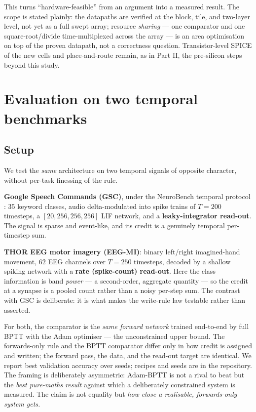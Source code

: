 \documentclass[11pt]{article}
\begin{document}
This turns ``hardware-feasible'' from an argument into a measured
result. The scope is stated plainly: the datapaths are verified at the
block, tile, and two-layer level, not yet as a full swept array;
resource \emph{sharing} --- one comparator and one square-root/divide
time-multiplexed across the array --- is an area optimisation on top of
the proven datapath, not a correctness question. Transistor-level SPICE
of the new cells and place-and-route remain, as in Part II, the
pre-silicon steps beyond this study.

\hypertarget{sec:eval}{%
\section{Evaluation on two temporal benchmarks}\label{sec:eval}}

\hypertarget{setup}{%
\subsection{Setup}\label{setup}}

We test the \emph{same} architecture on two temporal signals of opposite
character, without per-task finessing of the rule.

\textbf{Google Speech Commands (GSC)}, under the NeuroBench temporal
protocol \cite{warden2018speech, yik2024neurobench}: \(35\) keyword
classes, audio delta-modulated into spike trains of \(T=200\) timesteps,
a \([20,256,256,256]\) LIF network, and a \textbf{leaky-integrator
read-out}. The signal is sparse and event-like, and its credit is a
genuinely temporal per-timestep sum.

\textbf{THOR EEG motor imagery (EEG-MI)}: binary left/right
imagined-hand movement, \(62\) EEG channels over \(T=250\) timesteps,
decoded by a shallow spiking network with a \textbf{rate (spike-count)
read-out}. Here the class information is band \emph{power} --- a
second-order, aggregate quantity --- so the credit at a synapse is a
pooled count rather than a noisy per-step sum. The contrast with GSC is
deliberate: it is what makes the write-rule law testable rather than
asserted.

For both, the comparator is the \emph{same forward network} trained
end-to-end by full BPTT with the Adam optimiser --- the unconstrained
upper bound. The forwards-only rule and the BPTT comparator differ only
in how credit is assigned and written; the forward pass, the data, and
the read-out target are identical. We report best validation accuracy
over seeds; recipes and seeds are in the repository. The framing is
deliberately asymmetric: Adam-BPTT is not a rival to beat but the
\emph{best pure-maths result} against which a deliberately constrained
system is measured. The claim is not equality but \emph{how close a
realisable, forwards-only system gets.}
\end{document}
